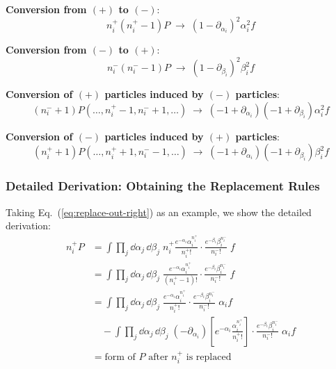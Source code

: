 \begin{derivation}
\textbf{Conversion from $(+)$ to $(-)$}:
\begin{equation}\label{eq:replace-conv-plus}
n_i^+(n_i^+ - 1)P \;\to\; (1 - \partial_{\alpha_i})^2 \alpha_i^2 f
\end{equation}

\textbf{Conversion from $(-)$ to $(+)$}:
\begin{equation}\label{eq:replace-conv-minus}
n_i^-(n_i^- - 1)P \;\to\; (1 - \partial_{\beta_i})^2 \beta_i^2 f
\end{equation}

\textbf{Conversion of $(+)$ particles induced by $(-)$ particles}:
\begin{equation}\label{eq:replace-conv-mix-plus}
(n_i^- + 1)P(\ldots, n_i^+ - 1, n_i^- + 1, \ldots) \;\to\; (-1 + \partial_{\alpha_i})(-1 + \partial_{\beta_i})\alpha_i^2 f
\end{equation}

\textbf{Conversion of $(-)$ particles induced by $(+)$ particles}:
\begin{equation}\label{eq:replace-conv-mix-minus}
(n_i^+ + 1)P(\ldots, n_i^+ + 1, n_i^- - 1, \ldots) \;\to\; (-1 + \partial_{\alpha_i})(-1 + \partial_{\beta_i})\beta_i^2 f
\end{equation}
\end{derivation}

\subsubsection{Detailed Derivation: Obtaining the Replacement Rules}

Taking Eq.~(\ref{eq:replace-out-right}) as an example, we show the detailed derivation:
\begin{align}
n_i^+ P &= \int \prod_j \dd\alpha_j \, \dd\beta_j \; n_i^+ \frac{e^{-\alpha_i}\alpha_i^{n_i^+}}{n_i^+!} \cdot \frac{e^{-\beta_i}\beta_i^{n_i^-}}{n_i^-!} \; f \nonumber\\
&= \int \prod_j \dd\alpha_j \, \dd\beta_j \; \frac{e^{-\alpha_i}\alpha_i^{n_i^+}}{(n_i^+ - 1)!} \cdot \frac{e^{-\beta_i}\beta_i^{n_i^-}}{n_i^-!} \; f \nonumber\\
&= \int \prod_j \dd\alpha_j \, \dd\beta_j \; \frac{e^{-\alpha_i}\alpha_i^{n_i^+}}{n_i^+!} \cdot \frac{e^{-\beta_i}\beta_i^{n_i^-}}{n_i^-!} \; \alpha_i f \nonumber\\
&\quad - \int \prod_j \dd\alpha_j \, \dd\beta_j \; (-\partial_{\alpha_i})\left[e^{-\alpha_i}\frac{\alpha_i^{n_i^+}}{n_i^+!}\right] \cdot \frac{e^{-\beta_i}\beta_i^{n_i^-}}{n_i^-!} \; \alpha_i f \nonumber\\
&= \text{form of } P \text{ after } n_i^+ \text{ is replaced} \nonumber
\end{align}

